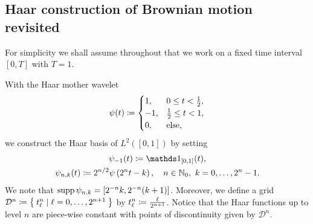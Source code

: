 \subsection{Haar construction of Brownian motion revisited}
\label{sec:haar-constr-brown}

For simplicity we shall assume throughout that we work on a fixed time
interval $[0,T]$ with $T = 1$.

With the Haar mother wavelet
\begin{equation}
  \label{eq:Haar-mother}
  \psi(t) \coloneqq
  \begin{cases}
    1, & 0 \le t < \frac{1}{2}, \\
    -1, & \frac{1}{2} \le t < 1, \\
    0, & \text{else},
  \end{cases}
\end{equation}
we construct the Haar basis of $L^2\left([0,1] \right)$ by setting
\begin{subequations}
  \label{eq:Haar-basis}
  \begin{gather}
    \label{eq:Haar-constant}
    \psi_{-1}(t) \coloneqq \indic{[0,1]}(t), \\
    \label{eq:Haar-nonconstant}
    \psi_{n,k}(t) \coloneqq 2^{n/2} \psi\left( 2^n t - k \right), \quad n \in
    \N_0, \ k = 0, \ldots, 2^n-1.
  \end{gather}
\end{subequations}
We note that $\operatorname{supp} \psi_{n,k} = [2^{-n}k, 2^{-n}(k+1)]$. Moreover, we define
a grid $\mathcal{D}^n \coloneqq \Set{t^n_\ell \mid \ell = 0, \ldots, 2^{n+1}}$ by
$t^n_\ell \coloneqq \frac{\ell}{2^{n+1}}$. Notice that the Haar functions up to level
$n$ are piece-wise constant with points of discontinuity given by
$\mathcal{D}^n$.

